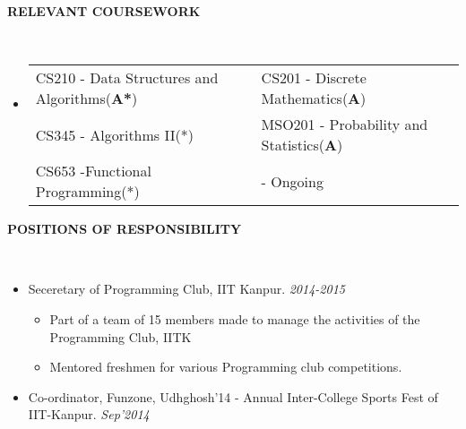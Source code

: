 \documentclass[a4paper,10pt]{article}
\newcommand{\lsep}{-0.5cm}
\newcommand{\resheading}[1]{{\small \colorbox{mygrey}{\begin{minipage}{0.975\textwidth}{\textbf{#1 \vphantom{p\^{E}}}}\end{minipage}}}}
\begin{document}
        \resheading{\textbf{RELEVANT COURSEWORK} }\\[\lsep] \vspace{2mm}
        \begin{itemize}
\item[]
                                        \begin{tabular}{p{69mm}@{\hskip 0.25in} p{80mm}} 
                                          CS210 - Data Structures and Algorithms(\textbf{A*}) & CS201 - Discrete Mathematics(\textbf{A})  \\
                                          CS345 - Algorithms II(*)             & MSO201 - Probability and Statistics(\textbf{A}) \\
                                          CS653 -Functional Programming(*)  & \hfill * - Ongoing
                                        \end{tabular}

        \end{itemize}

\vspace{-1mm}
        \resheading{\textbf{POSITIONS OF RESPONSIBILITY} }\\[\lsep] \vspace{1mm}
                                                   \begin{itemize} \itemsep -2pt
                                                  \item Seceretary of Programming Club, IIT Kanpur. \hfill \textit{2014-2015}
                                                    \vspace{-2mm}\begin{itemize}
                                                      \item Part of a team of 15 members made to manage the activities of the Programming Club, IITK
                                                      \item Mentored freshmen for various Programming club competitions.
                                                      \end{itemize}
                                                      \item Co-ordinator,
                                                        Funzone, Udhghosh'14 -
                                                        Annual Inter-College
                                                        Sports Fest of
                                                        IIT-Kanpur. \hfill \textit{Sep'2014}
                                                    \end{itemize}
      
\end{document}
